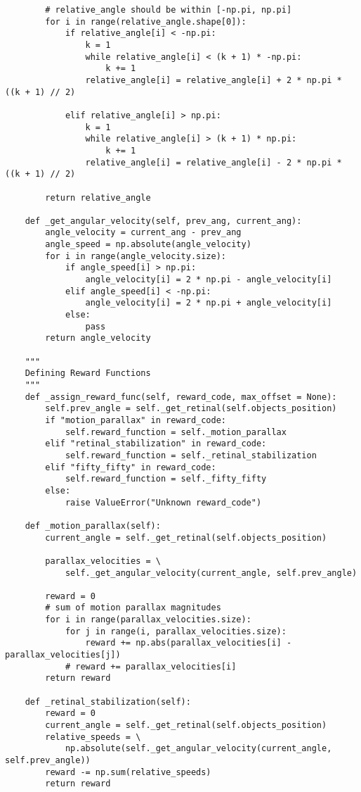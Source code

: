 \begin{lstlisting}
        # relative_angle should be within [-np.pi, np.pi]
        for i in range(relative_angle.shape[0]):
            if relative_angle[i] < -np.pi:
                k = 1
                while relative_angle[i] < (k + 1) * -np.pi:
                    k += 1
                relative_angle[i] = relative_angle[i] + 2 * np.pi * ((k + 1) // 2)

            elif relative_angle[i] > np.pi:
                k = 1
                while relative_angle[i] > (k + 1) * np.pi:
                    k += 1
                relative_angle[i] = relative_angle[i] - 2 * np.pi * ((k + 1) // 2)

        return relative_angle

    def _get_angular_velocity(self, prev_ang, current_ang):
        angle_velocity = current_ang - prev_ang
        angle_speed = np.absolute(angle_velocity)
        for i in range(angle_velocity.size):
            if angle_speed[i] > np.pi:
                angle_velocity[i] = 2 * np.pi - angle_velocity[i]
            elif angle_speed[i] < -np.pi:
                angle_velocity[i] = 2 * np.pi + angle_velocity[i]
            else:
                pass
        return angle_velocity

    """
    Defining Reward Functions
    """
    def _assign_reward_func(self, reward_code, max_offset = None):
        self.prev_angle = self._get_retinal(self.objects_position)
        if "motion_parallax" in reward_code:
            self.reward_function = self._motion_parallax
        elif "retinal_stabilization" in reward_code:
            self.reward_function = self._retinal_stabilization
        elif "fifty_fifty" in reward_code:
            self.reward_function = self._fifty_fifty
        else:
            raise ValueError("Unknown reward_code")

    def _motion_parallax(self):
        current_angle = self._get_retinal(self.objects_position)

        parallax_velocities = \
            self._get_angular_velocity(current_angle, self.prev_angle)

        reward = 0
        # sum of motion parallax magnitudes
        for i in range(parallax_velocities.size):
            for j in range(i, parallax_velocities.size):
                reward += np.abs(parallax_velocities[i] - parallax_velocities[j])
            # reward += parallax_velocities[i]
        return reward

    def _retinal_stabilization(self):
        reward = 0
        current_angle = self._get_retinal(self.objects_position)
        relative_speeds = \
            np.absolute(self._get_angular_velocity(current_angle, self.prev_angle))
        reward -= np.sum(relative_speeds)
        return reward


\end{lstlisting}
